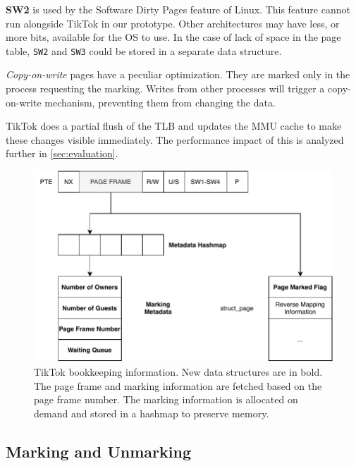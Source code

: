 \documentclass[conference]{IEEEtran}
\newcommand{\sysname}{TikTok}
\begin{document}
\textbf{SW2} is used by the Software Dirty Pages
feature of Linux. This feature cannot run alongside \sysname{} in our prototype.
Other architectures may have less, or more bits, available for the OS to use. In
the case of lack of space in the page table, \texttt{SW2} and \texttt{SW3} could
be stored in a separate data structure.

\emph{Copy-on-write} pages have a peculiar optimization. They are marked only in
the process requesting the marking. Writes from other processes will trigger a
copy-on-write mechanism, preventing them from changing the data.

\sysname{} does a partial flush of the TLB and updates the MMU cache to make these
changes visible immediately. The performance impact of this is analyzed further
in \autoref{sec:evaluation}.

\begin{figure}[]
  \centering
  \includegraphics[width=\linewidth]{img/book-keeping.pdf}
  \caption{\sysname{} bookkeeping information. New data structures are in bold. The page frame and marking information are fetched based on the
  page frame number. The marking information is allocated on demand and stored
  in a hashmap to preserve memory.}
  \label{fig:bookkeeping}
\end{figure}

\subsection{Marking and Unmarking}
\end{document}
